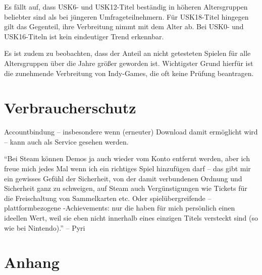 \documentclass[11pt]{scrartcl}
\begin{document}
Es fällt auf,
dass USK6- und USK12-Titel beständig in höheren Altersgruppen beliebter
sind als bei jüngeren Umfrageteilnehmern.
Für USK18-Titel hingegen gilt das Gegenteil,
ihre Verbreitung nimmt mit dem Alter ab.
Bei USK0- und USK16-Titeln ist kein eindeutiger Trend erkennbar.

Es ist zudem zu beobachten,
dass der Anteil an nicht getesteten Spielen für alle Altersgruppen
über die Jahre größer geworden ist.
Wichtigster Grund hierfür ist die zunehmende Verbreitung von Indy-Games,
die oft keine Prüfung beantragen.

\section{Verbraucherschutz}

Accountbindung -- insbesondere wenn (erneuter) Download damit ermöglicht wird
-- kann auch als Service gesehen werden.


``Bei Steam können Demos ja auch wieder vom Konto entfernt werden, aber ich freue mich jedes Mal wenn ich ein richtiges Spiel hinzufügen darf – das gibt mir ein gewisses Gefühl der Sicherheit, von der damit verbundenen Ordnung und Sicherheit ganz zu schweigen, auf Steam auch Vergünstigungen wie Tickets für die Freischaltung von Sammelkarten etc. Oder spielübergreifende – plattformbezogene -Achievements: nur die haben für mich persönlich einen ideellen Wert, weil sie eben nicht innerhalb eines einzigen Titels versteckt sind (so wie bei Nintendo).'' -- Pyri


\newpage
\section{Anhang}
\end{document}
